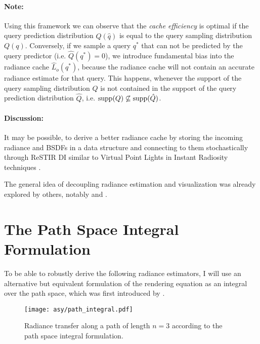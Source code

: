 \paragraph{Note:}
\label{par:cache_efficiency}
Using this framework we can observe that the \emph{cache efficiency} is optimal if the query prediction distribution $\hat{Q}(\hat{q})$ is equal to the query sampling distribution $Q(q)$.
Conversely, if we sample a query $q^*$ that can not be predicted by the query predictor (i.e. $\hat{Q}(q^*)=0$), we introduce fundamental bias into the radiance cache $\hat{L}_o(q^*)$, because the radiance cache will not contain an accurate radiance estimate for that query.
This happens, whenever the support of the query sampling distribution $Q$ is not contained in the support of the query prediction distribution $\hat{Q}$, i.e. $\operatorname{\mathrm{supp}}(Q) \not\subseteq \operatorname{\mathrm{supp}}(\hat{Q})$.

\paragraph{Discussion:} It may be possible, to derive a better radiance cache by storing the incoming radiance and BSDFs in a data structure and connecting to them stochastically through ReSTIR DI \parencite{bitterli2020} similar to Virtual Point Lights in Instant Radiosity techniques \parencite{keller1997}.

The general idea of decoupling radiance estimation and visualization was already explored by others, notably \textcite{walter1999} and \textcite{tole2002}.

\section{The Path Space Integral Formulation}
\label{sec:path_space_integral}
To be able to robustly derive the following radiance estimators, I will use an alternative but equivalent formulation of the rendering equation as an integral over the path space, which was first introduced by \textcite{veach1997}.
\begin{figure}[ht]
    \centering
    \texttt{[image: asy/path\_integral.pdf]}
\caption{Radiance transfer along a path of length $n=3$ according to the path space integral formulation.}
\label{fig:path_space_integral}
\end{figure}

